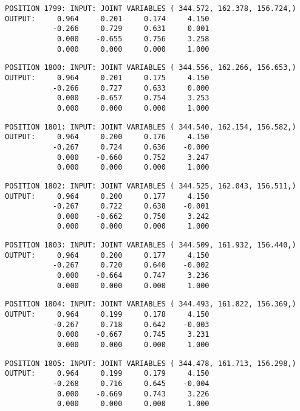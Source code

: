\begin{verbatim}
POSITION 1799: INPUT: JOINT VARIABLES ( 344.572, 162.378, 156.724,)
OUTPUT:     0.964     0.201     0.174     4.150
           -0.266     0.729     0.631     0.001
            0.000    -0.655     0.756     3.258
            0.000     0.000     0.000     1.000
\end{verbatim} \pagebreak[1]\begin{verbatim}
POSITION 1800: INPUT: JOINT VARIABLES ( 344.556, 162.266, 156.653,)
OUTPUT:     0.964     0.201     0.175     4.150
           -0.266     0.727     0.633     0.000
            0.000    -0.657     0.754     3.253
            0.000     0.000     0.000     1.000
\end{verbatim} \pagebreak[1]\begin{verbatim}
POSITION 1801: INPUT: JOINT VARIABLES ( 344.540, 162.154, 156.582,)
OUTPUT:     0.964     0.200     0.176     4.150
           -0.267     0.724     0.636    -0.000
            0.000    -0.660     0.752     3.247
            0.000     0.000     0.000     1.000
\end{verbatim} \pagebreak[1]\begin{verbatim}
POSITION 1802: INPUT: JOINT VARIABLES ( 344.525, 162.043, 156.511,)
OUTPUT:     0.964     0.200     0.177     4.150
           -0.267     0.722     0.638    -0.001
            0.000    -0.662     0.750     3.242
            0.000     0.000     0.000     1.000
\end{verbatim} \pagebreak[1]\begin{verbatim}
POSITION 1803: INPUT: JOINT VARIABLES ( 344.509, 161.932, 156.440,)
OUTPUT:     0.964     0.200     0.177     4.150
           -0.267     0.720     0.640    -0.002
            0.000    -0.664     0.747     3.236
            0.000     0.000     0.000     1.000
\end{verbatim} \pagebreak[1]\begin{verbatim}
POSITION 1804: INPUT: JOINT VARIABLES ( 344.493, 161.822, 156.369,)
OUTPUT:     0.964     0.199     0.178     4.150
           -0.267     0.718     0.642    -0.003
            0.000    -0.667     0.745     3.231
            0.000     0.000     0.000     1.000
\end{verbatim} \pagebreak[1]\begin{verbatim}
POSITION 1805: INPUT: JOINT VARIABLES ( 344.478, 161.713, 156.298,)
OUTPUT:     0.964     0.199     0.179     4.150
           -0.268     0.716     0.645    -0.004
            0.000    -0.669     0.743     3.226
            0.000     0.000     0.000     1.000
\end{verbatim} \pagebreak[1]\begin{verbatim}

\end{verbatim}
